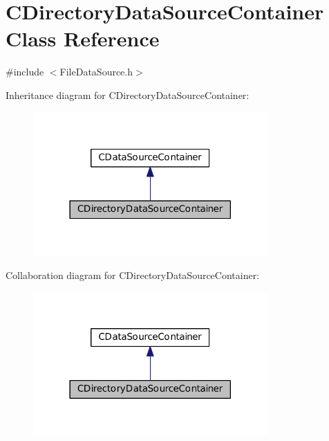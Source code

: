 \hypertarget{classCDirectoryDataSourceContainer}{}\section{C\+Directory\+Data\+Source\+Container Class Reference}
\label{classCDirectoryDataSourceContainer}


{\ttfamily \#include $<$File\+Data\+Source.\+h$>$}



Inheritance diagram for C\+Directory\+Data\+Source\+Container\+:\nopagebreak
\begin{figure}[H]
\begin{center}
\leavevmode
\includegraphics[width=254pt]{classCDirectoryDataSourceContainer__inherit__graph}
\end{center}
\end{figure}


Collaboration diagram for C\+Directory\+Data\+Source\+Container\+:\nopagebreak
\begin{figure}[H]
\begin{center}
\leavevmode
\includegraphics[width=254pt]{classCDirectoryDataSourceContainer__coll__graph}
\end{center}
\end{figure}
